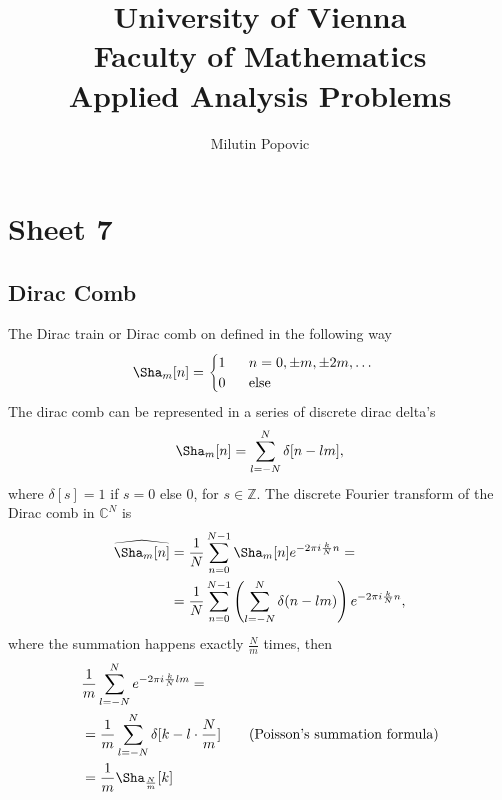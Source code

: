 \documentclass[a4paper]{article}
\title{University of Vienna\\ Faculty of Mathematics\\
\vspace{1cm}Applied Analysis Problems
}
\author{Milutin Popovic}
\begin{document}
\maketitle
\tableofcontents

\section{Sheet 7}
\subsection{Dirac Comb}
The Dirac train or Dirac comb on defined in the following way
\begin{align}
    \Sha_m[n] =
    \begin{cases}
        1\;\;\;\;\;\; n = 0, \pm m, \pm 2m,\dots\\
        0\;\;\;\;\;\; \text{else}
    \end{cases}
\end{align}
The dirac comb can be represented in a series of discrete dirac delta's
\begin{align}
    \Sha_m[n] = \sum_{l=-N}^N \delta[n - lm],
\end{align}
where $\delta[s] = 1$ if $s = 0$ else $0$, for $s \in \mathbb{Z}$.
The discrete Fourier transform of the Dirac comb in $\mathbb{C}^N$ is
\begin{align}
    \widehat{\Sha_m[n]}
    &=\frac{1}{N}\sum_{n=0}^{N-1} \Sha_m[n] e^{-2\pi i \frac{k}{N}n}=\\
    &=\frac{1}{N}\sum_{n=0}^{N-1}
        \left(
            \sum_{l=-N}^N \delta(n-lm)
            \right)
            e^{-2\pi i \frac{k}{N}n},
\end{align}
where the summation happens exactly $\frac{N}{m}$ times, then
\begin{align}
    &\frac{1}{m}\sum_{l=-N}^N e^{-2\pi i \frac{k}{N}lm}=\\
    &= \frac{1}{m} \sum_{l=-N}^N \delta[k - l\cdot \frac{N}{m}]\qquad
    \text{(Poisson's summation formula)} \\
    &= \frac{1}{m}\Sha_{\frac{N}{m}}[k]
\end{align}
\end{document}
